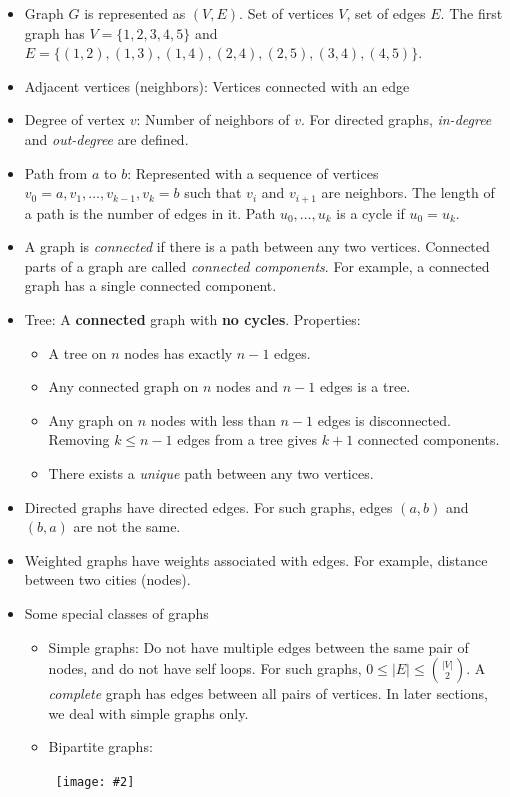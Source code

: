 \documentclass{article}
\newcommand{\B}[1]{\textbf{#1}}
\newcommand{\I}[1]{\textit{#1}}
\newcommand{\image}[2]{\
    \begin{center}\
        \texttt{[image: \#2]}\
    \end{center}\
}
\begin{document}
\begin{sloppypar}
    \begin{itemize}
        \item Graph $G$ is represented as $(V, E)$. Set of vertices $V$, set of edges $E$. The first graph has $V = \{1,2,3,4,5\}$ and $E = \{(1,2), (1,3), (1,4), (2,4), (2,5), (3,4), (4,5)\}$.
        \item Adjacent vertices (neighbors): Vertices connected with an edge
        \item Degree of vertex $v$: Number of neighbors of $v$. For directed graphs, \I{in-degree} and \I{out-degree} are defined.
        \item Path from $a$ to $b$: Represented with a sequence of vertices $v_0=a, v_1, \dots, v_{k-1}, v_k=b$ such that $v_i$ and $v_{i+1}$ are neighbors. The length of a path is the number of edges in it. Path $u_0, \dots, u_k$ is a cycle if $u_0 = u_k$.
        \item A graph is \I{connected} if there is a path between any two vertices. Connected parts of a graph are called \I{connected components}. For example, a connected graph has a single connected component.
        \item Tree: A \B{connected} graph with \B{no cycles}. Properties:
        \begin{itemize}
            \item A tree on $n$ nodes has exactly $n-1$ edges.
            \item Any connected graph on $n$ nodes and $n-1$ edges is a tree.
            \item Any graph on $n$ nodes with less than $n-1$ edges is disconnected. Removing $k\le n-1$ edges from a tree gives $k+1$ connected components.
            \item There exists a \I{unique} path between any two vertices.
        \end{itemize}
        \item Directed graphs have directed edges. For such graphs, edges $(a,b)$ and $(b,a)$ are not the same.
        \item Weighted graphs have weights associated with edges. For example, distance between two cities (nodes).
        \item Some special classes of graphs
        \begin{itemize}
            \item Simple graphs: Do not have multiple edges between the same pair of nodes, and do not have self loops. For such graphs, $0\le |E|\le {|V| \choose 2}$. A \I{complete} graph has edges between all pairs of vertices. In later sections, we deal with simple graphs only.
            \item Bipartite graphs:
            \image{0.5}{../images/bipart.png}
        \end{itemize}
    \end{itemize}


\end{sloppypar}
\end{document}
